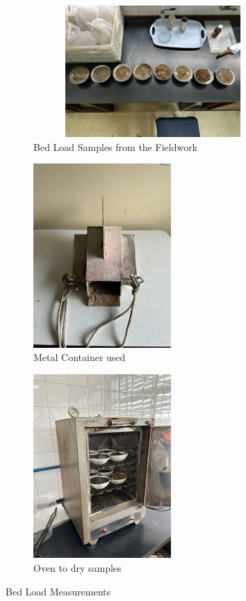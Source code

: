 \begin{figure}[H]
    \centering
    \begin{subfigure}[b]{0.6\textwidth}
        \includegraphics[width= 10cm, height =5cm]{figures/appendixE/soilsamples.jpg}
        \caption{Bed Load Samples from the Fieldwork}
        \label{fig:second}
    \end{subfigure}

    \vspace{0.5cm}

    \begin{subfigure}[b]{0.48\textwidth}
        \includegraphics[width=\linewidth, height=7cm]{figures/appendixE/metalcontainer.jpg}
        \caption{Metal Container used}
        \label{fig:third}
    \end{subfigure}
    \hfill
    \begin{subfigure}[b]{0.48\textwidth}
        \includegraphics[width=\linewidth, height=7cm]{figures/appendixE/oven.jpg}
        \caption{Oven to dry samples}
        \label{fig:fourth}
    \end{subfigure}

    \caption{Bed Load Measurements}
    \label{fig:bed load}
\end{figure}

